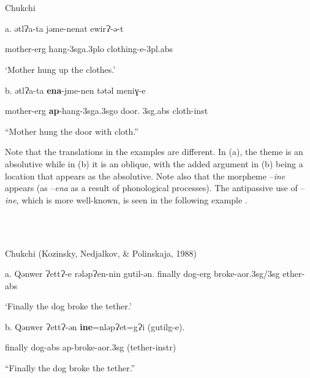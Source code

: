\documentclass[output=paper,modfonts,nonflat]{langsci/langscibook}
\begin{document}
\ea%
    \label{ex:key:1}
    \gll\\
        \\
    \glt
    \z

          Chukchi \citep{Dunn1999}

a.  ǝtlɁa-ta  jǝme-nenat    ewirɁ-ǝ{}-t

mother-erg  hang-3sga.3plo  clothing-e{}-3pl.abs

‘Mother hung up the clothes.’  

b.  ǝtlɁa-ta  \textbf{ena}{}-jme-nen    tǝtǝl    meniɣ-e

  mother-erg  \textbf{ap}{}-hang-3sga.3sgo  door. 3sg.abs  cloth-inst

  “Mother hung the door with cloth.”

Note that the translations in the examples are different.  In (a), the theme is an absolutive while in (b) it is an oblique, with the added argument in (b) being a location that appears as the absolutive.   Note also that the morpheme –\textit{ine} appears (as –\textit{ena} as a result of phonological processes).  The antipassive use of –\textit{ine}, which is more well-known, is seen in the following example .

\ea%
    \label{ex:key:2}
    \gll\\
        \\
    \glt
    \z

          Chukchi (Kozinsky, Nedjalkov, \& Polinskaja, 1988)

a.  Qǝnwer  ɁettɁ-e  rǝlǝpɁen-nin    gutil-ǝn.  finally  dog{}-erg  broke{}-aor.3sg/3sg  ether{}-abs

  ‘Finally the dog broke the tether.’

b.  Qǝnwer  ɁettɁ-ǝn  \textbf{ine}=nlǝpɁet=gɁi  (gutilg-e).

  finally  dog-abs  ap{}-broke-aor.3sg  (tether-instr)

  “Finally the dog broke the tether.”
\end{document}

